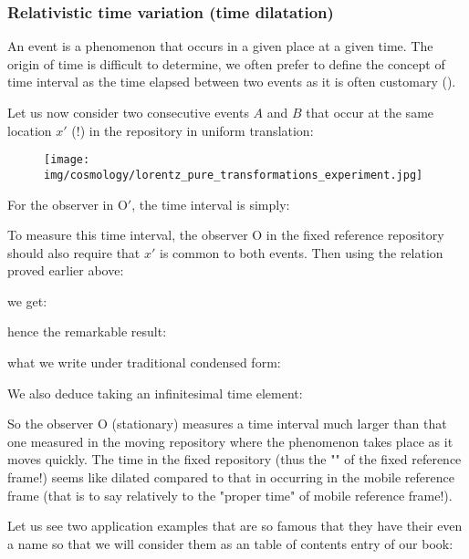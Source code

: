 	\subsubsection{Relativistic time variation (time dilatation)}
	An event is a phenomenon that occurs in a given place at a given time. The origin of time is difficult to determine, we often prefer to define the concept of time interval as the time elapsed between two events as it is often customary ().
	
	Let us now consider two consecutive events $A$ and $B$ that occur at the same location $x'$ (!) in the repository in uniform translation:
	\begin{figure}[H]
		\begin{center}
		\texttt{[image: img/cosmology/lorentz\_pure\_transformations\_experiment.jpg]}
		\end{center}	
	\end{figure}
	For the observer in $\text{O}'$, the time interval is simply:
	
	To measure this time interval, the observer O in the fixed reference repository should also require that $x'$ is common to both events. Then using the relation proved earlier above:
	
	we get:
	
	hence the remarkable result:
	
	what we write under traditional condensed form:
	
	We also deduce taking an infinitesimal time element:
	
	So the observer O (stationary) measures a time interval much larger than that one measured in the moving repository where the phenomenon takes place as it moves quickly. The time in the fixed repository (thus the "" of the fixed reference frame!) seems like dilated compared to that in occurring in the mobile reference frame (that is to say relatively to the "proper time" of mobile reference frame!).
	
	Let us see two application examples that are so famous that they have their even a name so that we will consider them as an table of contents entry of our book:
	

